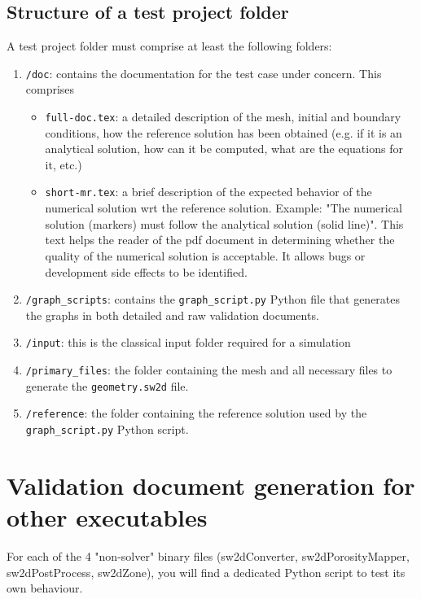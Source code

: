 \subsection{Structure of a test project folder}
A test project folder must comprise at least the following folders:
%
%
\begin{enumerate}
%
\item \texttt{/doc}: contains the documentation for the test case under concern. This comprises
\begin{itemize} 
\item \texttt{full-doc.tex}: a detailed description of the mesh, initial and boundary conditions, how the reference solution has been obtained (e.g. if it is an analytical solution, how can it be computed, what are the equations for it, etc.)
\item \texttt{short-mr.tex}: a brief description of the expected behavior of the numerical solution wrt the reference solution. 
Example: "The numerical solution (markers) must follow the analytical solution (solid line)". 
This text helps the reader of the pdf document in determining whether the quality of the numerical solution is acceptable. 
It allows bugs or development side effects to be identified.
\end{itemize}
%
\item \texttt{/graph\_scripts}: contains the \texttt{graph\_script.py} Python file that generates the graphs in both detailed and raw validation documents. 
%
\item \texttt{/input}: this is the classical input folder required for a simulation 
%
\item \texttt{/primary\_files}: the folder containing the mesh and all necessary files to generate the \texttt{geometry.sw2d} file.
%
\item \texttt{/reference}: the folder containing the reference solution used by the \texttt{graph\_script.py} Python script.
\end{enumerate}


\section{Validation document generation for other executables}\label{sec:merge-others}

For each of the 4 "non-solver" \swdd binary files (sw2dConverter, sw2dPorosityMapper, sw2dPostProcess, sw2dZone), 
you will find a dedicated Python script to test its own behaviour.

